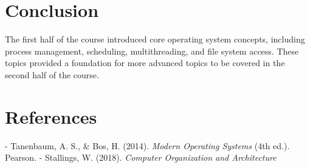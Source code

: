 \documentclass[12pt]{article}
\begin{document}
\section{Conclusion}
The first half of the course introduced core operating system concepts, including process management, scheduling, multithreading, and file system access. These topics provided a foundation for more advanced topics to be covered in the second half of the course.

\section{References}
- Tanenbaum, A. S., & Bos, H. (2014). \textit{Modern Operating Systems} (4th ed.). Pearson.
- Stallings, W. (2018). \textit{Computer Organization and Architecture} 
\end{document}
